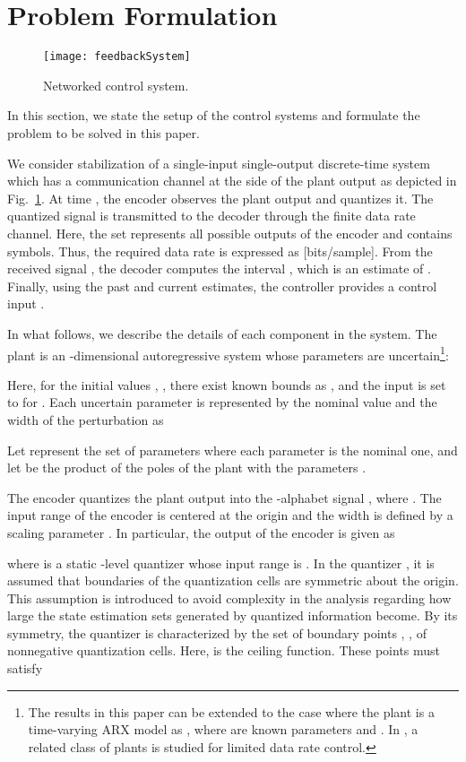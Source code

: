 \documentclass[a4paper, 11pt]{article}
\theoremstyle{definition}
\newcommand{\fref}[1]{Fig.~\ref{#1}}
\begin{document}
\section{Problem Formulation}\label{sec,problem}
\begin{figure}[t]
 \centering
 \texttt{[image: feedbackSystem]}
 \caption{Networked control system.}
 \label{fig,system}
\end{figure}
In this section, we state the setup of the control systems and formulate
the problem to be solved in this paper.

We consider stabilization of a single-input single-output discrete-time system
which has a communication channel at the side of the plant output as depicted
in \fref{fig,system}.
At time , the encoder observes the plant output  and quantizes it.
The quantized signal  is transmitted to the decoder through
the finite data rate channel.
Here, the set  represents all possible outputs of the encoder
and contains  symbols.
Thus, the required data rate is expressed as  [bits/sample].
From the received signal , the decoder computes the interval ,
which is an estimate of .
Finally, using the past and current estimates, the controller provides
a control input .

In what follows, we describe the details of each component in the system.
The plant is an -dimensional autoregressive system
whose parameters are uncertain\footnote{
The results in this paper can be extended to the case where
the plant is a time-varying ARX model as
,
where  are known parameters and .
In \cite{Nair2000}, a related class of plants is studied for limited
data rate control.}:

Here, for the initial values , , there exist known
bounds  as , and the input  is set to  for .
Each uncertain parameter  is represented by the nominal value 
and the width  of the perturbation as

Let  represent the set of parameters  where each parameter
is the nominal one, and let  be the product of the poles of the
plant with the parameters .


The encoder quantizes the plant output  into the -alphabet signal
, where .
The input range of the encoder is centered at the origin and the width
is defined by a scaling parameter . 
In particular, the output  of the encoder is given as

where  is a static -level quantizer whose input range is .
In the quantizer , it is assumed that boundaries of the quantization
cells are symmetric about the origin.
This assumption is introduced to avoid complexity in the analysis regarding
how large the state estimation sets generated by quantized information become.
By its symmetry, the quantizer  is characterized by the set of boundary points
, ,
of nonnegative quantization cells.
Here,  is the ceiling function.
These points must satisfy
\end{document}
